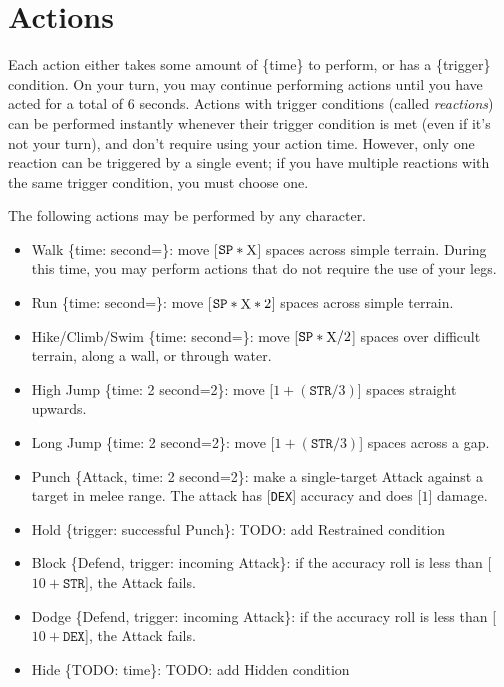 \documentclass[12pt]{article}
\newcommand{\STR}{\texttt{STR}}
\newcommand{\DEX}{\texttt{DEX}}
\newcommand{\SP}{\texttt{SP}}
\newcommand{\X}{\text{{\lower 0.2mm \hbox{X}}}}
\newcommand{\TIME}[1]{\{time: #1 second\if1=#1{}\else{s}\fi\}}
\newcommand{\TRIG}[1]{\{trigger: #1\}}
\newcommand{\Attack}[1]{\{Attack, time: #1 second\if1=#1{}\else{s}\fi\}}
\newcommand{\Defend}{\{Defend, trigger: incoming Attack\}}
\begin{document}
\pagebreak
\section{Actions}

Each action either takes some amount of \{time\} to perform, or has a \{trigger\} condition. On your turn, you may continue performing actions until you have acted for a total of 6 seconds. Actions with trigger conditions (called \textit{reactions}) can be performed instantly whenever their trigger condition is met (even if it’s not your turn), and don’t require using your action time. However, only one reaction can be triggered by a single event; if you have multiple reactions with the same trigger condition, you must choose one.

The following actions may be performed by any character.
\begin{itemize}

\item Walk \TIME{\X}: move [$\SP * \X$] spaces across simple terrain. During this time, you may perform actions that do not require the use of your legs.

\item Run \TIME{\X}: move [$\SP * \X * 2$] spaces across simple terrain.

\item Hike/Climb/Swim \TIME{\X}: move [$\SP * \X / 2$] spaces over difficult terrain, along a wall, or through water.

\item High Jump \TIME{2}: move [$1 + (\STR / 3)$] spaces straight upwards.

\item Long Jump \TIME{2}: move [$1 + (\STR / 3)$] spaces across a gap.

\item Punch \Attack{2}: make a single-target Attack against a target in melee range. The attack has [\DEX{}] accuracy and does [$1$] damage.

\item Hold \TRIG{successful Punch}: TODO: add Restrained condition

\item Block \Defend: if the accuracy roll is less than [$10 + \STR{}$], the Attack fails.

\item Dodge \Defend: if the accuracy roll is less than [$10 + \DEX{}$], the Attack fails.

\item Hide \{TODO: time\}: TODO: add Hidden condition


\end{itemize}
\end{document}
